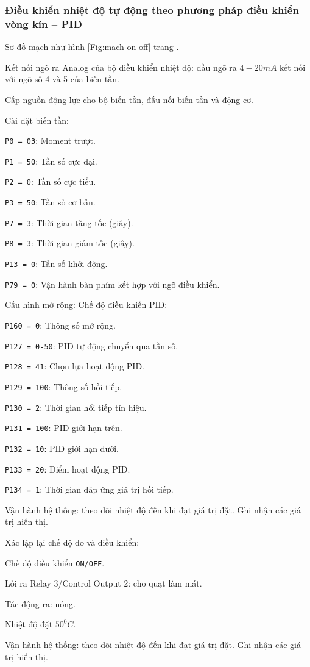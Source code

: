 \documentclass[13pt,a4paper]{extarticle}
\begin{document}
\subsubsection{Điều khiển nhiệt độ tự động theo phương pháp điều khiển vòng kín -- PID}
\begin{list}{--}{}
\item Sơ đồ mạch như hình \ref{Fig:mach-on-off} trang \pageref{Fig:mach-on-off}.
\item Kết nối ngõ ra Analog của bộ điều khiển nhiệt độ: đầu ngõ ra $4-20mA$ kết nối với ngõ số 4 và 5 của biến tần.
\item Cấp nguồn động lực cho bộ biến tần, đấu nối biến tần và động cơ.
\item Cài đặt biến tần:
\begin{list}{+}{}
\item \verb|P0 = 03|: Moment trượt.
\item \verb|P1 = 50|: Tần số cực đại.
\item \verb|P2 = 0|: Tần số cực tiểu.
\item \verb|P3 = 50|: Tần số cơ bản.
\item \verb|P7 = 3|: Thời gian tăng tốc (giây).
\item \verb|P8 = 3|: Thời gian giảm tốc (giây).
\item \verb|P13 = 0|: Tần số khởi động. 
\item \verb|P79 = 0|: Vận hành bàn phím kết hợp với ngõ điều khiển.
\end{list}
\item Cấu hình mở rộng: Chế độ điều khiển PID:
\begin{list}{+}{}
\item \verb|P160 = 0|: Thông số mở rộng.
\item \verb|P127 = 0-50|: PID tự động chuyển qua tần số.
\item \verb|P128 = 41|: Chọn lựa hoạt động PID.
\item \verb|P129 = 100|: Thông số hồi tiếp.
\item \verb|P130 = 2|: Thời gian hổi tiếp tín hiệu.
\item \verb|P131 = 100|: PID giới hạn trên.
\item \verb|P132 = 10|: PID giới hạn dưới.
\item \verb|P133 = 20|: Điểm hoạt động PID.
\item \verb|P134 = 1|: Thời gian đáp ứng giá trị hồi tiếp.
\end{list}
\item Vận hành hệ thống: theo dõi nhiệt độ đến khi đạt giá trị đặt. Ghi nhận các giá trị hiển thị.
\item Xác lập lại chế độ đo và điều khiển: 
\begin{list}{+}{}
\item Chế độ điều khiển \verb|ON/OFF|.
\item Lối ra Relay 3/Control Output 2: cho quạt làm mát.
\item Tác động ra: nóng.
\item Nhiệt độ đặt $50^0C$.
\end{list}
\item Vận hành hệ thống: theo dõi nhiệt độ đến khi đạt giá trị đặt. Ghi nhận các giá trị hiển thị.
\end{list}
\end{document}
